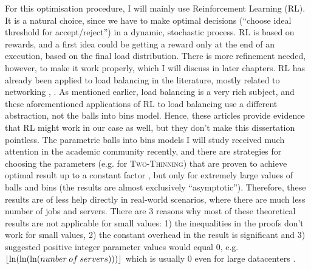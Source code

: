 For this optimisation procedure, I will mainly use Reinforcement Learning (RL). It is a natural choice, since we have to make optimal decisions (``choose ideal threshold for accept/reject'') in a dynamic, stochastic process. RL is based on rewards, and a first idea could be getting a reward only at the end of an execution, based on the final load distribution. There is more refinement needed, however, to make it work properly, which I will discuss in later chapters. RL has already been applied to load balancing in the literature, mostly related to networking \cite{attiah2020RLcellular}, \cite{yeo2021controller}. As mentioned earlier, load balancing is a very rich subject, and these aforementioned applications of RL to load balancing use a different abstraction, not the balls into bins model. Hence, these articles provide evidence that RL might work in our case as well, but they don't make this dissertation pointless. The parametric balls into bins models I will study received much attention in the academic community recently, and there are strategies for choosing the parameters (e.g. for \textsc{Two-Thinning}) that are proven to achieve optimal result up to a constant factor \cite{feldheim2021thinning}, but only for extremely large values of balls and bins (the results are almost exclusively ``asymptotic''). Therefore, these results are of less help directly in real-world scenarios, where there are much less number of jobs and servers. There are $3$ reasons why most of these theoretical results are not applicable for small values: 1) the inequalities in the proofs don't work for small values, 2) the constant overhead in the result is significant and 3) suggested positive integer parameter values would equal $0$, e.g. $\lfloor\ln(\ln(\ln(nunber\: of \: servers)))\rfloor$ which is usually $0$ even for large datacenters \cite{feldheim2021longtermthinning}.



